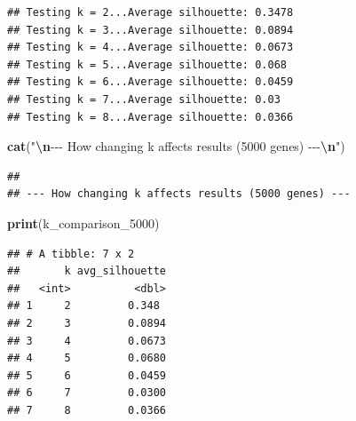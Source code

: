 \documentclass[
]{article}
\newenvironment{Shaded}{\begin{snugshade}}{\end{snugshade}}
\newcommand{\AttributeTok}[1]{\textcolor[rgb]{0.13,0.29,0.53}{#1}}
\newcommand{\ControlFlowTok}[1]{\textcolor[rgb]{0.13,0.29,0.53}{\textbf{#1}}}
\newcommand{\FunctionTok}[1]{\textcolor[rgb]{0.13,0.29,0.53}{\textbf{#1}}}
\newcommand{\NormalTok}[1]{#1}
\newcommand{\OtherTok}[1]{\textcolor[rgb]{0.56,0.35,0.01}{#1}}
\newcommand{\SpecialCharTok}[1]{\textcolor[rgb]{0.81,0.36,0.00}{\textbf{#1}}}
\newcommand{\StringTok}[1]{\textcolor[rgb]{0.31,0.60,0.02}{#1}}
\begin{document}
\begin{verbatim}
## Testing k = 2...Average silhouette: 0.3478
## Testing k = 3...Average silhouette: 0.0894
## Testing k = 4...Average silhouette: 0.0673
## Testing k = 5...Average silhouette: 0.068
## Testing k = 6...Average silhouette: 0.0459
## Testing k = 7...Average silhouette: 0.03
## Testing k = 8...Average silhouette: 0.0366
\end{verbatim}

\begin{Shaded}
\end{Shaded}

\begin{Shaded}
\begin{Highlighting}[]
\FunctionTok{cat}\NormalTok{(}\StringTok{"}\SpecialCharTok{\textbackslash{}n}\StringTok{{-}{-}{-} How changing k affects results (5000 genes) {-}{-}{-}}\SpecialCharTok{\textbackslash{}n}\StringTok{"}\NormalTok{)}
\end{Highlighting}
\end{Shaded}

\begin{verbatim}
## 
## --- How changing k affects results (5000 genes) ---
\end{verbatim}

\begin{Shaded}
\begin{Highlighting}[]
\FunctionTok{print}\NormalTok{(k\_comparison\_5000)}
\end{Highlighting}
\end{Shaded}

\begin{verbatim}
## # A tibble: 7 x 2
##       k avg_silhouette
##   <int>          <dbl>
## 1     2         0.348 
## 2     3         0.0894
## 3     4         0.0673
## 4     5         0.0680
## 5     6         0.0459
## 6     7         0.0300
## 7     8         0.0366
\end{verbatim}
\end{document}
